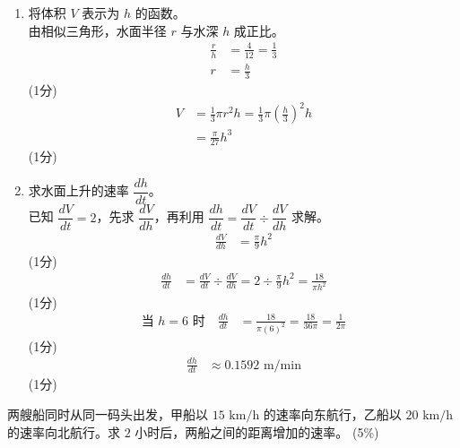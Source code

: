 \documentclass[12pt,a4paper]{exam-zh}
\begin{document}
\begin{solution}
    \begin{enumerate}[label=(\alph*)]
        \item 将体积 $V$ 表示为 $h$ 的函数。 \\
        由相似三角形，水面半径 $r$ 与水深 $h$ 成正比。
        \begin{align*}
            \frac{r}{h} &= \frac{4}{12} = \frac{1}{3} \\
            r &= \frac{h}{3}
        \end{align*}
        \hfill (1分) \\
        \begin{align*}
            V &= \frac{1}{3}\pi r^2h = \frac{1}{3}\pi\left(\frac{h}{3}\right)^2h \\
            &= \frac{\pi}{27}h^3
        \end{align*}
        \hfill (1分)

        \item 求水面上升的速率 $\dfrac{dh}{dt}$。 \\
        已知 $\dfrac{dV}{dt}=2$，先求 $\dfrac{dV}{dh}$，再利用 $\dfrac{dh}{dt}=\dfrac{dV}{dt}\div\dfrac{dV}{dh}$ 求解。
        \begin{align*}
            \frac{dV}{dh} &= \frac{\pi}{9}h^2
        \end{align*}
        \hfill (1分) \\
        \begin{align*}
            \frac{dh}{dt} &= \frac{dV}{dt}\div\frac{dV}{dh} = 2\div\frac{\pi}{9}h^2 = \frac{18}{\pi h^2}
        \end{align*}
        \hfill (1分) \\
        \begin{align*}
            \text{当 } h=6 \text{ 时} \quad \frac{dh}{dt} &= \frac{18}{\pi(6)^2} = \frac{18}{36\pi} = \frac{1}{2\pi}
        \end{align*}
        \hfill (1分) \\
        \begin{align*}
            \frac{dh}{dt} &\approx 0.1592\text{ m/min}
        \end{align*}
        \hfill (1分)
    \end{enumerate}
\end{solution}

\begin{question}[points = 5]
    两艘船同时从同一码头出发，甲船以 $15\text{ km/h}$ 的速率向东航行，乙船以 $20\text{ km/h}$ 的速率向北航行。求 $2$ 小时后，两船之间的距离增加的速率。
    \hfill (5\%)
\end{question}
\end{document}
